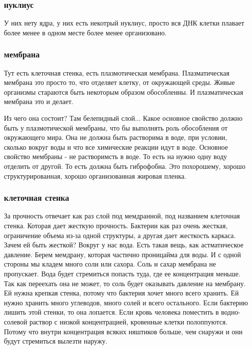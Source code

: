 \subsubsection{нуклиус}
У них нету ядра, у них есть некотрый нуклиус, просто вся ДНК
клетки плавает более менее в одном месте более менее организовано.

\subsubsection{мембрана}
Тут есть клеточная стенка, есть плазмотическая мембрана. Плазматическая мембрана
это просто то, что отделяет клетку, от окружающей среды. Живые организмы стараются
быть некоторым образом обособленны. И плазматическая мембрана это и делает.
                                                      
Из чего она состоит? Там белепидный слой... Какое основное
свойство должно быть у плазмотической мембраны, что бы выполнять роль обособления
от окружающего мира. Она не должна быть растворима в воде,
при условии, сколько вокруг воды и что все химические реакции идут в воде. Основное
свойство мембраны - не растворимсть в воде. То есть на нужно одну воду отделить от другой.
То есть должна быть гиброфобна. Это похорошему, хорошо структурированная, хорошо 
организованная жировая пленка. 

\subsubsection{клеточная стенка}
За прочность отвечает как раз слой под мемдранной, под названием клеточная стенка. Которая 
дает жесткую прочность. Бактерии как раз очень жесткая, ограничение объема из-за 
одной структуры, а другая дает жесткость каркаса. Зачем ей быть жесткой? Вокруг у нас
вода. Есть такая вещь, как астматическое давление. Берем мемдрану, которая 
частично проницайма для воды. И с одной стороны мы кладем много соли или 
сахора. Соль и сахар мембрана не пропускает. Вода будет стремиться попасть туда, 
где ее концентрация меньше. Так как переехать она не может, 
то соль будет оказывать давление на мембрану. Ей нужна крепкая стенка, 
потому что бактерия хочет много всего хранить. Ей нужно хранить много углеводов, 
много солей и всего остального. Если бактерию лишить этой стенки, то она лопается. 
Если кровь человека поместить в водно-солевой раствор с низкой концентрацией, кровенные 
клетки полоппуются. Потому что внутри концентрация всяких няштиков больше, чем снаружи и
они будут стремиться вылезти наружу. 

